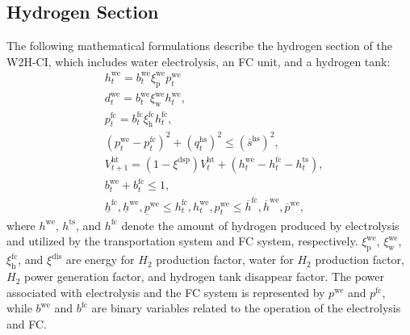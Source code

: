 \documentclass[conference]{IEEEtran}
\begin{document}
\subsection{Hydrogen Section}\label{sec:Hydrogen}
The following mathematical formulations describe the hydrogen section of the W2H-CI, which includes water electrolysis, an FC unit, and a hydrogen tank:
\begin{subequations} \label{eq_WHNmodel}
	\begin{align}
&h^\textrm{we}_t = b^\textrm{we}_t \xi^\textrm{we}_\textrm{p} p^\textrm{we}_t \label{eq_H2_1}\\
&d^\textrm{we}_t = b^\textrm{we}_t \xi^\textrm{we}_\textrm{w}  h^\textrm{we}_t,\label{eq_H2_2}\\
&p^\textrm{fc}_t =  b^\textrm{fc}_t \xi^\textrm{fc}_\textrm{h} h^\textrm{fc}_t,\label{eq_H2_3}\\
&(p^\textrm{we}_t - p^\textrm{fc}_t)^2 + (q^\textrm{hs}_t)^2 \leq (\overline{s}^\textrm{hs})^2,\label{eq_H2_4}\\
&V^\textrm{ht}_{t+1} = (1-\xi^\textrm{dsp})V^\textrm{ht}_{t} + (h^\textrm{we}_t - h^\textrm{fc}_t - h^\textrm{ts}_t),\label{eq_H2_5}\\
&b^\textrm{we}_t + b^\textrm{fc}_t \leq 1,\label{eq_H2_6}\\
&\underline{h}^\textrm{fc}, \underline{h}^\textrm{we}, \underline{p}^\textrm{we} \le h^\textrm{fc}_t, h^\textrm{we}_t, {p}^\textrm{we}_t \leq \overline{h}^\textrm{fc}, \overline{h}^\textrm{we}, \overline{p}^\textrm{we},\label{eq_H2_7}
\end{align}
\end{subequations}
where $h^\textrm{we}$, $h^\textrm{ts}$, and $h^\textrm{fc}$ denote the amount of hydrogen produced by electrolysis and utilized by the transportation system and FC system, respectively. $\xi^\textrm{we}_\textrm{p}$, $\xi^\textrm{we}_\textrm{w}$, $\xi^\textrm{fc}_\textrm{h}$, and $\xi^\textrm{dis}$ are energy for $H_2$ production factor, water for $H_2$ production factor, $H_2$ power generation factor, and hydrogen tank disappear factor. The power associated with electrolysis and the FC system is represented by $p^\textrm{we}$ and $p^\textrm{fc}$, while $b^\textrm{we}$ and $b^\textrm{fc}$ are binary variables related to the operation of the electrolysis and FC.
\end{document}

